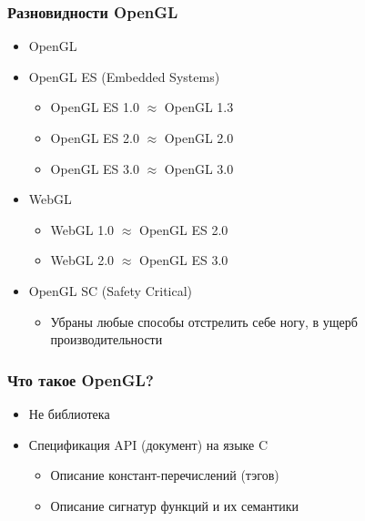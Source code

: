 \documentclass{beamer}
\begin{document}
\begin{frame}
\frametitle{Разновидности OpenGL}
\begin{itemize}
\item OpenGL
\pause
\item OpenGL ES (Embedded Systems)
\begin{itemize}
\item OpenGL ES 1.0 $\approx$ OpenGL 1.3
\item OpenGL ES 2.0 $\approx$ OpenGL 2.0
\item OpenGL ES 3.0 $\approx$ OpenGL 3.0
\end{itemize}
\pause
\item WebGL
\begin{itemize}
\item WebGL 1.0 $\approx$ OpenGL ES 2.0
\item WebGL 2.0 $\approx$ OpenGL ES 3.0
\end{itemize}
\pause
\item OpenGL SC (Safety Critical)
\begin{itemize}
\item Убраны любые способы отстрелить себе ногу, в ущерб производительности
\end{itemize}
\end{itemize}
\end{frame}

\begin{frame}
\frametitle{Что такое OpenGL?}
\begin{itemize}
\item {\color{red}Не} библиотека
\item Спецификация API (документ) на языке C
\begin{itemize}
\item Описание констант-перечислений (тэгов)
\item Описание сигнатур функций и их семантики
\end{itemize}
\end{itemize}
\end{frame}
\end{document}
